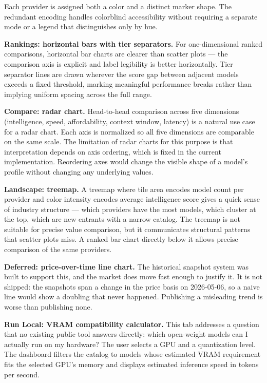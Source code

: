 \documentclass{article}
\begin{document}
Each provider is assigned both a color and a distinct marker shape. The
redundant encoding handles colorblind accessibility without requiring a
separate mode or a legend that distinguishes only by hue.

\textbf{Rankings: horizontal bars with tier separators.}
For one-dimensional ranked comparisons, horizontal bar charts are clearer
than scatter plots --- the comparison axis is explicit and label legibility is
better horizontally. Tier separator lines are drawn wherever the score gap
between adjacent models exceeds a fixed threshold, marking meaningful
performance breaks rather than implying uniform spacing across the full range.

\textbf{Compare: radar chart.}
Head-to-head comparison across five dimensions (intelligence, speed,
affordability, context window, latency) is a natural use case for a radar
chart. Each axis is normalized so all five dimensions are comparable on the
same scale. The limitation of radar charts for this purpose is that
interpretation depends on axis ordering, which is fixed in the current
implementation. Reordering axes would change the visible shape of a model's
profile without changing any underlying values.

\textbf{Landscape: treemap.}
A treemap where tile area encodes model count per provider and color
intensity encodes average intelligence score gives a quick sense of industry
structure --- which providers have the most models, which cluster at the top,
which are new entrants with a narrow catalog. The treemap is not suitable for
precise value comparison, but it communicates structural patterns that scatter
plots miss. A ranked bar chart directly below it allows precise comparison of
the same providers.

\textbf{Deferred: price-over-time line chart.}
The historical snapshot system was built to support this, and the market does
move fast enough to justify it. It is not shipped: the snapshots span a change
in the price basis on 2026-05-06, so a naive line would show a doubling that
never happened. Publishing a misleading trend is worse than publishing none.

\textbf{Run Local: VRAM compatibility calculator.}
This tab addresses a question that no existing public tool answers directly:
which open-weight models can I actually run on my hardware? The user selects a
GPU and a quantization level. The dashboard filters the catalog to models
whose estimated VRAM requirement fits the selected GPU's memory and displays
estimated inference speed in tokens per second.
\end{document}
